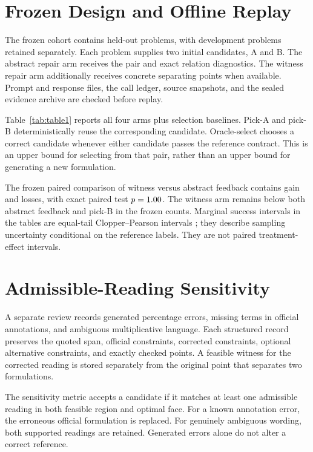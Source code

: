 \documentclass[letterpaper]{article}
\begin{document}
\section{Frozen Design and Offline Replay}
The frozen cohort contains \HeldoutN{} held-out problems, with development problems retained separately. Each problem supplies two initial candidates, A and B. The abstract repair arm receives the pair and exact relation diagnostics. The witness repair arm additionally receives concrete separating points when available. Prompt and response files, the call ledger, source snapshots, and the sealed evidence archive are checked before replay.

Table~\ref{tab:table1} reports all four arms plus selection baselines. Pick-A and pick-B deterministically reuse the corresponding candidate. Oracle-select chooses a correct candidate whenever either candidate passes the reference contract. This is an upper bound for selecting from that pair, rather than an upper bound for generating a new formulation.

The frozen paired comparison of witness versus abstract feedback contains \PrimaryGains{} gain and \PrimaryLosses{} losses, with exact paired test $p=1.00$. The witness arm remains below both abstract feedback and pick-B in the frozen counts. Marginal success intervals in the tables are equal-tail Clopper--Pearson intervals \citep{scipybinomial}; they describe sampling uncertainty conditional on the reference labels. They are not paired treatment-effect intervals.



\section{Admissible-Reading Sensitivity}
A separate review records generated percentage errors, missing terms in official annotations, and ambiguous multiplicative language. Each structured record preserves the quoted span, official constraints, corrected constraints, optional alternative constraints, and exactly checked points. A feasible witness for the corrected reading is stored separately from the original point that separates two formulations.

The sensitivity metric accepts a candidate if it matches at least one admissible reading in both feasible region and optimal face. For a known annotation error, the erroneous official formulation is replaced. For genuinely ambiguous wording, both supported readings are retained. Generated errors alone do not alter a correct reference.
\end{document}
